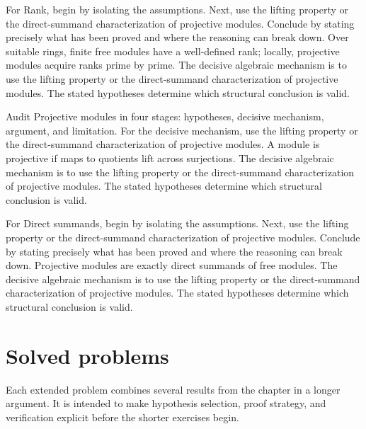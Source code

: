 \begin{example}\label{ex:v13-worked-02}
For Rank, begin by isolating the assumptions. Next, use the lifting property or the direct-summand characterization of projective modules. Conclude by stating precisely what has been proved and where the reasoning can break down. Over suitable rings, finite free modules have a well-defined rank; locally, projective modules acquire ranks prime by prime. The decisive algebraic mechanism is to use the lifting property or the direct-summand characterization of projective modules. The stated hypotheses determine which structural conclusion is valid.
\end{example}

\begin{example}\label{ex:v13-worked-03}
Audit Projective modules in four stages: hypotheses, decisive mechanism, argument, and limitation. For the decisive mechanism, use the lifting property or the direct-summand characterization of projective modules. A module is projective if maps to quotients lift across surjections. The decisive algebraic mechanism is to use the lifting property or the direct-summand characterization of projective modules. The stated hypotheses determine which structural conclusion is valid.
\end{example}

\begin{example}\label{ex:v13-worked-04}
For Direct summands, begin by isolating the assumptions. Next, use the lifting property or the direct-summand characterization of projective modules. Conclude by stating precisely what has been proved and where the reasoning can break down. Projective modules are exactly direct summands of free modules. The decisive algebraic mechanism is to use the lifting property or the direct-summand characterization of projective modules. The stated hypotheses determine which structural conclusion is valid.
\end{example}

\section{Solved problems}
Each extended problem combines several results from the chapter in a longer argument. It is intended to make hypothesis selection, proof strategy, and verification explicit before the shorter exercises begin.

